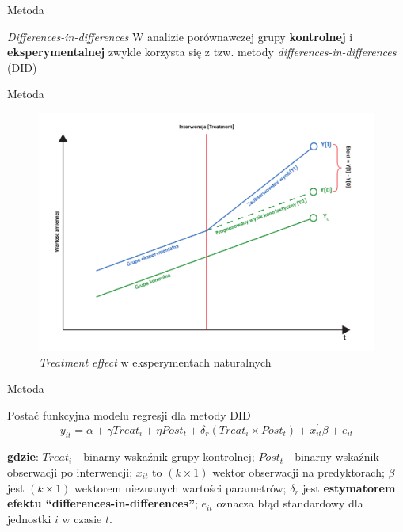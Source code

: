 \documentclass[12pt]{beamer}
\begin{document}
\begin{frame}{Metoda}

\begin{block}{\textit{Differences-in-differences}}
W analizie porównawczej grupy \textbf{kontrolnej} i \textbf{eksperymentalnej} zwykle korzysta się z tzw. metody \textit{differences-in-differences} (DID)
\end{block}

\end{frame}

\begin{frame}{Metoda}

\begin{figure}
\includegraphics[scale=0.35]{did.pdf}
\caption{\label{fig:did}\textit{Treatment effect} w eksperymentach naturalnych}
\end{figure}

\end{frame}


\begin{frame}{Metoda}

\begin{block}{Postać funkcyjna modelu regresji dla metody DID}
$$ y_{it} = \alpha + \gamma Treat_i + \eta Post_t + \delta_r (Treat_i \times Post_t) + x_{it}^{'}\beta + e_{it} $$

\scriptsize

\textbf{gdzie}: $Treat_i$ - binarny wskaźnik grupy kontrolnej; $Post_t$ - binarny wskaźnik obserwacji po interwencji; $x_{it}$ to $(k \times 1)$ wektor obserwacji na predyktorach; $\beta$ jest $(k \times 1)$ wektorem nieznanych wartości parametrów; $\delta_r$ jest \textbf{estymatorem efektu ``differences-in-differences''}; $e_{it}$ oznacza błąd standardowy dla jednostki $i$ w czasie $t$.
\end{block}

\end{frame}
\end{document}
